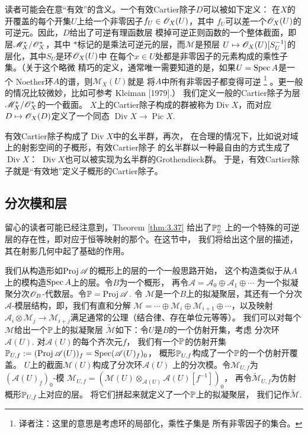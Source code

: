 读者可能会在意“有效”的含义。一个有效Cartier除子$D$可以被如下定义：
在$X$的开覆盖的每个开集$U$上给一个非零因子$f_U\in \oo_X(U)$，其中%
$f_U$可以差一个$\oo_X(U)$的可逆元。因此，$D$给出了可逆有理函数层
模掉可逆正则函数的一个整体截面，即层$\mathscr M_X^*/\oo_X^*$，其中
$*$标记的是乘法可逆元的层，而$\mathscr M$是预层
$U\mapsto \oo_X(U)[S_U^{-1}]$的层化，其中$S_U$是环$\oo_X(U)$中
在每个$x\in U$处都是非零因子的元素构成的乘性子集。（关于这个略微
精巧的定义，通常唯一需要知道的是，如果$U=\spec A$是一个
Noether环$A$的谱，则$\mathscr M_X(U)$就是
将$A$中所有非零因子都变得可逆%
\footnote{译者注：这里的意思是考虑环的局部化，乘性子集是
所有非零因子的集合。}%
。更一般的情况比较微妙，比如可参考 Kleiman [1979].）
我们定义一般的Cartier除子为层$\mathscr M_X^*/\oo_X^*$的一个截面。
$X$上的Cartier除子构成的群被称为$\operatorname{Div} X$，而对应
$D\mapsto \oo_X(D)$定义了一个同态
$\operatorname{Div} X\to \operatorname{Pic} X$.

有效Cartier除子构成了$\operatorname{Div} X$中的幺半群，再次，
在合理的情况下，比如说对域上的射影空间的子概形，有效Cartier除子
的幺半群以一种最自由的方式生成了$\operatorname{Div} X$：
$\operatorname{Div} X$也可以被实现为幺半群的Grothendieck群。
于是，有效Cartier除子就是“有效地”定义子概形的Cartier除子。

\subsection{分次模和层} \label{s:3.2.6}

留心的读者可能已经注意到，Theorem \ref{thm:3.37} 给出了$\P_\zz^n$
上的一个特殊的可逆层的存在性，即对应于恒等映射的那个。在这节中，
我们将给出这个层的描述，其在射影几何中起了基础的作用。

我们从构造形如$\proj \mathscr A$的概形上的层的一个一般思路开始，
这个构造类似于从$A$上的模构造$\spec A$上的层。令$B$为一个概形，
再令$\mathscr A=\mathscr A_0\oplus\mathscr A_1\oplus\cdots$
为一个拟凝聚分次$\oo_B$-代数层。令$\P=\proj \mathscr A$. 令
$\mathscr M$是一个$B$上的拟凝聚层，其还有一个分次
$\mathscr A$-模层结构，即，我们有直和分解
$\mathscr M=\cdots\oplus \mathscr M_i\oplus \mathscr M_{i+1}
\oplus \cdots$，以及映射$\mathscr A_i\otimes \mathscr M_j
\to \mathscr M_{i+j}$满足通常的公理（结合律、存在单位元等等）。
我们可以对每个$\mathscr M$给出一个$\P$上的拟凝聚层
$\widetilde{\mathscr M}$如下：令$U$是$B$的一个仿射开集，考虑
分次环$\mathscr A(U)$. 对$\mathscr A(U)$的每个齐次元$f$，
我们有一个$\P$的仿射开集
$\P_{U,f}:=(\proj \mathscr A(U))_f=\spec (\mathscr A(U)_f)_0$，
概形$\P_{U,f}$构成了一个$\P$的一个仿射开覆盖。
$U$上的截面$\mathscr M(U)$构成了分次环$\mathscr A(U)$
上的分次模。令$\mathscr M_{U,f}$为$(\mathscr A(U)_f)_0$-模
$\mathscr M_{U,f}=(\mathscr M(U)
\otimes_{\mathscr A(U)}\mathscr A(U)[f^{-1}])_0$，
再令$\widetilde{\mathscr M}_{U,f}$为仿射概形$\P_{U,f}$上对应的层。
将它们拼起来就定义了一个$\P$上的拟凝聚层，
我们记作$\widetilde{\mathscr M}$.


